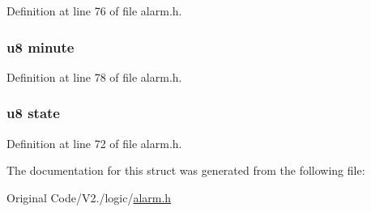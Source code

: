\-Definition at line 76 of file alarm.\-h.

\hypertarget{structalarm_ae0a353dafc35c2935794f93a4e473a19}{
\subsubsection[{minute}]{\setlength{\rightskip}{0pt plus 5cm}u8 {\bf minute}}}\label{structalarm_ae0a353dafc35c2935794f93a4e473a19}


\-Definition at line 78 of file alarm.\-h.

\hypertarget{structalarm_ad0bc4e4e6e6ffc52d9079b73afd73887}{
\subsubsection[{state}]{\setlength{\rightskip}{0pt plus 5cm}u8 {\bf state}}}\label{structalarm_ad0bc4e4e6e6ffc52d9079b73afd73887}


\-Definition at line 72 of file alarm.\-h.



\-The documentation for this struct was generated from the following file\-:\begin{DoxyCompactItemize}
\item 
\-Original Code/\-V2./logic/\hyperlink{alarm_8h}{alarm.\-h}\end{DoxyCompactItemize}
